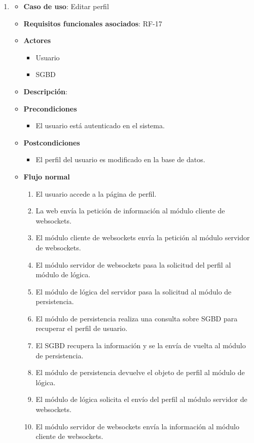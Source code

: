 \begin{enumerate}
\item %
  \begin{itemize}
  \item \textbf{Caso de uso}: Editar perfil
  \item \textbf{Requisitos funcionales asociados}: RF-17
  \item \textbf{Actores}
    \begin{itemize}
    \item Usuario
    \item SGBD
    \end{itemize}
  \item \textbf{Descripción}: 
  \item \textbf{Precondiciones}
    \begin{itemize}
    \item El usuario está autenticado en el sistema.
    \end{itemize}
  \item \textbf{Postcondiciones}
    \begin{itemize}
    \item El perfil del usuario es modificado en la base de datos.
    \end{itemize}
  \item \textbf{Flujo normal}
    \begin{enumerate}
    \item El usuario accede a la página de perfil.
    \item La web envía la petición de información al módulo cliente de websockets.
    \item El módulo cliente de websockets envía la petición al módulo servidor de websockets.
    \item El módulo servidor de websockets pasa la solicitud del perfil al módulo de lógica.
    \item El módulo de lógica del servidor pasa la solicitud al módulo de persistencia.
    \item El módulo de persistencia realiza una consulta sobre SGBD para recuperar el perfil de usuario.
    \item El SGBD recupera la información y se la envía de vuelta al módulo de persistencia.
    \item El módulo de persistencia devuelve el objeto de perfil al módulo de lógica.
    \item El módulo de lógica solicita el envío del perfil al módulo servidor de websockets.
    \item El módulo servidor de websockets envía la información al módulo cliente de websockets.

\end{enumerate}
\end{itemize}
\end{enumerate}
